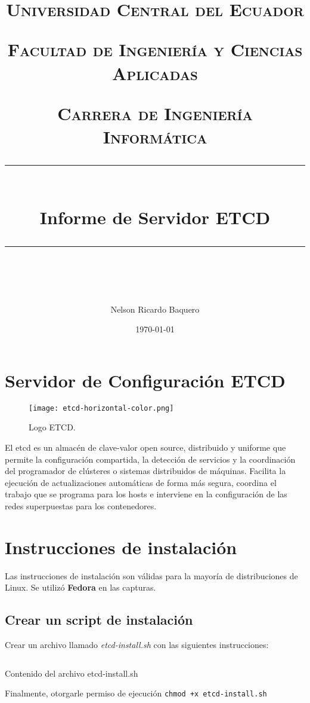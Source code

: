 \documentclass[11pt]{scrartcl} %
\title{	
	\normalfont\normalsize
	\textsc{Universidad Central del Ecuador}

	\textsc{Facultad de Ingeniería y Ciencias Aplicadas}

	\textsc{Carrera de Ingeniería Informática}
	\vspace{6pt} %
	\rule{\linewidth}{0.5pt}\\ %
	\vspace{20pt} %
	{\huge Informe de Servidor ETCD}\\ %
	\vspace{12pt} %
	\rule{\linewidth}{2pt}\\ %
	\vspace{12pt} %
}
\author{\LARGE Nelson Ricardo Baquero} %
\date{\normalsize\today} %
\begin{document}
\maketitle %

\section{Servidor de Configuración ETCD}

\begin{figure}[h] %
	\centering
	\texttt{[image: etcd-horizontal-color.png]} %
	\caption{Logo ETCD.}
\end{figure}

El etcd es un almacén de clave-valor open source, distribuido y uniforme que permite la configuración compartida, la detección de servicios y la coordinación del programador de clústeres o sistemas distribuidos de máquinas. Facilita la ejecución de actualizaciones automáticas de forma más segura, coordina el trabajo que se programa para los hosts e interviene en la configuración de las redes superpuestas para los contenedores.


\section{Instrucciones de instalación}

Las instrucciones de instalación son válidas para la mayoría de distribuciones de Linux.
Se utilizó \textbf{Fedora} en las capturas.

\subsection{Crear un script de instalación}

Crear un archivo llamado \emph{etcd-install.sh} con las siguientes instrucciones:

\begin{listing}[H]
	\inputminted[frame=lines,numbers=left]{bash}{etcd-install.sh}
	\caption{Contenido del archivo etcd-install.sh}
	\label{lst:install-script}
\end{listing}

Finalmente, otorgarle permiso de ejecución \texttt{chmod +x etcd-install.sh}
\end{document}
